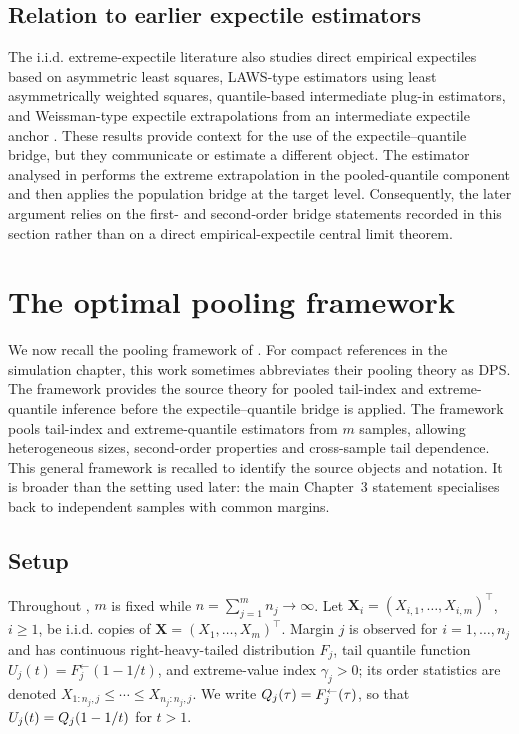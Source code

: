 \subsection{Relation to earlier expectile estimators}

The i.i.d. extreme-expectile literature also studies direct empirical
expectiles based on asymmetric least squares, LAWS-type estimators using
least asymmetrically weighted squares, quantile-based intermediate
plug-in estimators, and Weissman-type expectile extrapolations from an
intermediate expectile anchor
\parencite{DaouiaGirardStupfler2018,DaouiaGirardStupfler2020,DavisonPadoanStupfler2023}.
These results provide context for the use of the expectile--quantile
bridge, but they communicate or estimate a different object. The estimator
analysed in  performs the extreme extrapolation in
the pooled-quantile component and then applies the population bridge at the
target level. Consequently, the later argument relies on the first- and
second-order bridge statements recorded in this section rather than on a
direct empirical-expectile central limit theorem.

\section{The optimal pooling framework}
\label{sec:bg:pooling}

We now recall the pooling framework of
\textcite{DaouiaPadoanStupfler2021}. For compact references in the simulation
chapter, this work sometimes abbreviates their pooling theory as DPS. The
framework provides the source
theory for pooled tail-index and extreme-quantile inference before the
expectile--quantile bridge is applied. The framework pools tail-index and
extreme-quantile estimators from $m$ samples, allowing heterogeneous
sizes, second-order properties and cross-sample tail dependence.
This general framework is recalled to identify the source objects and
notation. It is broader than the setting used later: the main Chapter~3
statement specialises back to independent samples with common margins.

\subsection{Setup}

Throughout , $m$ is fixed while
$n=\sum_{j=1}^{m}n_j\to\infty$. Let
$\bm X_i=(X_{i,1},\ldots,X_{i,m})^\top$, $i\ge1$, be i.i.d. copies of
$\bm X=(X_1,\ldots,X_m)^\top$. Margin $j$ is observed for
$i=1,\ldots,n_j$ and has continuous right-heavy-tailed distribution
$F_j$, tail quantile function \(U_j(t)=F_j^\leftarrow(1-1/t)\), and
extreme-value index $\gamma_j>0$; its order statistics are denoted
$X_{1:n_j,j}\le\cdots\le X_{n_j:n_j,j}$.
We write $Q_j(\tau)=F_j^\leftarrow(\tau)$, so that
$U_j(t)=Q_j(1-1/t)$ for $t>1$.

